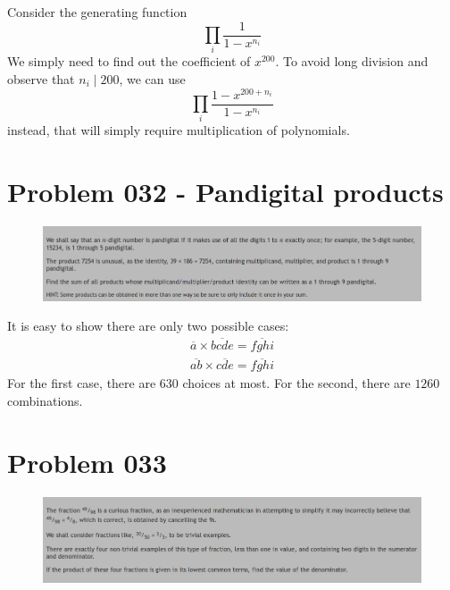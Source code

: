 \begin{sol}
Consider the generating function 
$$\prod_{i}\dfrac{1}{1 - x^{n_i}}$$
We simply need to find out the coefficient of $x^{200}$. To avoid long division and observe that $n_i \mid 200$, we can use 
$$\prod_{i}\dfrac{1 - x ^ {200 + n_i}}{1 - x^{n_i}} $$
instead, that will simply require multiplication of polynomials.
\vspace{1cm}
\end{sol}
\section{Problem 032 - Pandigital products}
\begin{prob}
	\begin{figure}[htb!]
		\begin{center}
			\includegraphics[scale = 0.4]{pic/032.png}
		\end{center}
	\end{figure}
\end{prob}
\begin{sol}
It is easy to show there are only two possible cases:
\begin{eqnarray}
\overline{a} \times \overline{bcde} = \overline{fghi}\\
\overline{ab}\times \overline{cde} = \overline{fghi}
\end{eqnarray}
For the first case, there are $630$ choices at most. For the second, there are $1260$ combinations.
\end{sol}
\newpage
\section{Problem 033}
\begin{prob}
	\begin{figure}[htb!]
		\begin{center}
			\includegraphics[scale = 0.4]{pic/033.png}
		\end{center}
	\end{figure}
\end{prob}
